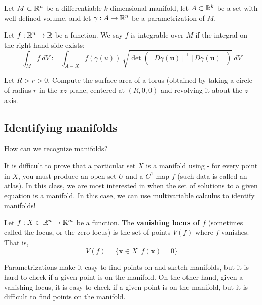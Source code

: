 \begin{definition}
Let $M \subset \mathbb{R}^n$ be a differentiable $k$-dimensional manifold, let $A \subset \mathbb{R}^k$ be a set with well-defined volume, and let $\gamma : A \to \mathbb{R}^n$ be a parametrization of $M$. 


Let $f : \mathbb{R}^n \to \mathbb{R}$ be a function.  We say $f$ is integrable over $M$ if the integral on the right hand side exists:
$$\int_{M} f \ dV := \int_{A-X} f (\gamma(u)) \ \sqrt{\det([D\gamma(\bm{u})]^\top [D\gamma(\bm{u})])} \ dV$$

\end{definition}

\begin{example}
    Let $R > r > 0$. Compute the surface area of a torus (obtained by taking a circle of radius $r$  in the $xz$-plane, centered at $(R,0,0)$ and revolving it about the $z$-axis.
\end{example}

















\subsection{Identifying manifolds}

\begin{motivating}
    How can we recognize manifolds?
\end{motivating}

It is difficult to prove that a particular set $X$ is a manifold using  - for every point in $X$, you must produce an open set $U$ and a $C^1$-map $f$ (such data is called an atlas).  In this class, we are most interested in when the set of solutions to a given equation is a manifold.  In this case, we can use multivariable calculus to identify manifolds!
    
    \begin{definition}
    Let $f : X \subset \mathbb{R}^n \to \mathbb{R}^m$ be a function. The \textbf{vanishing locus of $f$} (sometimes called the locus, or the zero locus) is the set of points $V(f)$ where $f$ vanishes.  That is, $$V(f) = \{\bm{x} \in X \ | f(\bm{x}) = 0 \} $$
    \end{definition}


   Parametrizations make it easy to find points on and sketch manifolds, but it is hard to check if a given point is on the manifold.  On the other hand, given a vanishing locus, it is easy to check if a given point is on the manifold, but it is difficult to find points on the manifold.  

